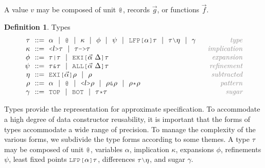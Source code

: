 \documentclass[acmsmall]{acmart}
\theoremstyle{definition}
\newtheorem{definition}{Definition}[section]
\begin{document}
A value $v$ may be composed of unit $\J{@}$, records $\vec{g}$, or functions $\vec{f}$. 

\hfill
\begin{definition} Types 
  \label{def:types}
  \[\begin{array}[t]{r@{}l@{}r}
    \nonterm{\tau} & \is 
    \begin{array}[t]{@{}l}
      \alpha \sep
      \J{@} \sep
      \kappa \sep 
      \phi \sep 
      \psi \sep 
      \J{LFP[}\alpha\J{]}\tau \sep
      \tau \typdiff \eta \sep
      \gamma
    \end{array}
    & \com{type}
    \\
    \nonterm{\kappa} & \is 
    \begin{array}[t]{@{}l}
      \J{<} l \J{>} \tau \sep 
      \tau\J{->}\tau
    \end{array}
    & \com{implication}
    \\
    \nonterm{\phi} & \is 
    \begin{array}[t]{@{}l}
      \tau\J{|}\tau \sep 
      \J{EXI[}\vec{\alpha}\ \Delta \J{]} \tau
    \end{array}
    & \com{expansion}
    \\
    \nonterm{\psi} & \is 
    \begin{array}[t]{@{}l}
      \tau\J{\&}\tau \sep 
      \J{ALL[}\vec{\alpha}\ \Delta \J{]} \tau
    \end{array}
    & \com{refinement}
    \\
    \nonterm{\eta} & \is 
    \begin{array}[t]{@{}l}
      \J{EXI[}\vec{\alpha} \J{]} \rho \sep 
      \rho
    \end{array}
    & \com{subtracted}
    \\
    \nonterm{\rho} & \is 
    \begin{array}[t]{@{}l}
      \alpha \sep
      \J{@} \sep
      \J{<}l\J{>}\rho \sep 
      \rho\J{\&}\rho \sep
      \rho\J{*}\rho
    \end{array}
    & \com{pattern}
    \\
    \nonterm{\gamma} & \is 
    \begin{array}[t]{@{}l}
      \J{TOP} \sep \J{BOT} \sep 
      \tau \J{*} \tau 
    \end{array}
    & \com{sugar}
  \end{array}\]
\end{definition}
\hfill

Types provide the representation for approximate specification.
To accommodate a high degree of data constructor reusability,
it is important that the forms of types accommodate a wide range of precision.
To manage the complexity of the various forms, we subdivide the type forms
according to some themes.
A type $\tau$ may be composed of unit $\J{@}$, variables $\alpha$, 
implication $\kappa$, expansions $\phi$, refinements $\psi$,
least fixed points $\J{LFP[}\alpha \J{]} \tau$,
differences $\tau \typdiff \eta$, and sugar $\gamma$.
\end{document}

